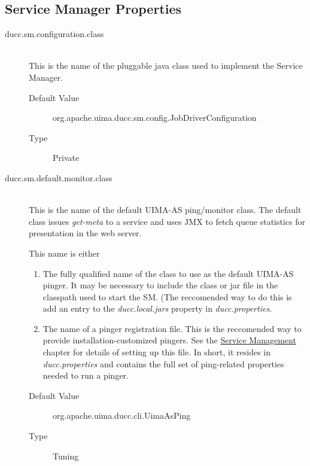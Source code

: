   



\subsection{Service Manager Properties}
    \begin{description}

      \item[ducc.sm.configuration.class] \hfill \\
        This is the name of the pluggable java class used to implement the Service Manager. 
        \begin{description}
          \item[Default Value] org.apache.uima.ducc.sm.config.JobDriverConfiguration 
          \item[Type] Private 
        \end{description}

      \item[ducc.sm.default.monitor.class] \hfill \\
        This is the name of the default UIMA-AS ping/monitor class.  The default class issues
        {\em get-meta} to a service and uses JMX to fetch queue statistics for presentation in
        the web server.

        This name is either
        \begin{enumerate}
          \item The fully qualified name of the class to use as the default UIMA-AS pinger. It may
            be necessary to include the class or jar file in the classpath used to start the SM.
            (The reccomended way to do this is add an entry to the {\em ducc.local.jars} property
            in {\em ducc.properties.}

          \item The name of a pinger registration file.  This is the reccomended way to 
            provide installation-customized pingers.  See the \hyperref[chap:sm]{Service Management}
            chapter for details of setting up this file.  In short, it resides in {\em ducc.properties}
            and contains the full set of ping-related properties needed to run a pinger.
        \end{enumerate}
        
        \begin{description}
          \item[Default Value] org.apache.uima.ducc.cli.UimaAsPing
          \item[Type] Tuning 
        \end{description}
        

\end{description}
